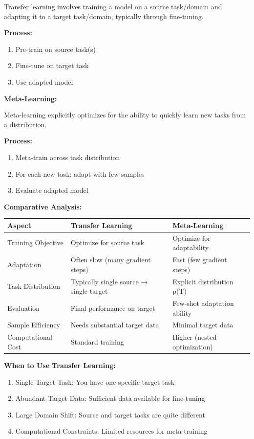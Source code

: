 \documentclass[12pt]{article}
\begin{document}
{{			Transfer learning involves training a model on a source task/domain and adapting it to a target task/domain, typically through fine-tuning.
			
			\textbf{Process:}
			\begin{enumerate}
				\item Pre-train on source task(s)
				\item Fine-tune on target task
				\item Use adapted model
			\end{enumerate}
			
			\textbf{Meta-Learning:}
			
			Meta-learning explicitly optimizes for the ability to quickly learn new tasks from a distribution.
			
			\textbf{Process:}
			\begin{enumerate}
				\item Meta-train across task distribution
				\item For each new task: adapt with few samples
				\item Evaluate adapted model
			\end{enumerate}
			
			\textbf{Comparative Analysis:}
			
			\begin{center}
			\begin{tabular}{|l|l|l|}
			\hline
			\textbf{Aspect} & \textbf{Transfer Learning} & \textbf{Meta-Learning} \\
			\hline
			Training Objective & Optimize for source task & Optimize for adaptability \\
			Adaptation & Often slow (many gradient steps) & Fast (few gradient steps) \\
			Task Distribution & Typically single source → single target & Explicit distribution p(T) \\
			Evaluation & Final performance on target & Few-shot adaptation ability \\
			Sample Efficiency & Needs substantial target data & Minimal target data \\
			Computational Cost & Standard training & Higher (nested optimization) \\
			\hline
			\end{tabular}
			\end{center}
			
			\textbf{When to Use Transfer Learning:}
			\begin{enumerate}
				\item Single Target Task: You have one specific target task
				\item Abundant Target Data: Sufficient data available for fine-tuning
				\item Large Domain Shift: Source and target tasks are quite different
				\item Computational Constraints: Limited resources for meta-training
			\end{enumerate}
			
}}
\end{document}
